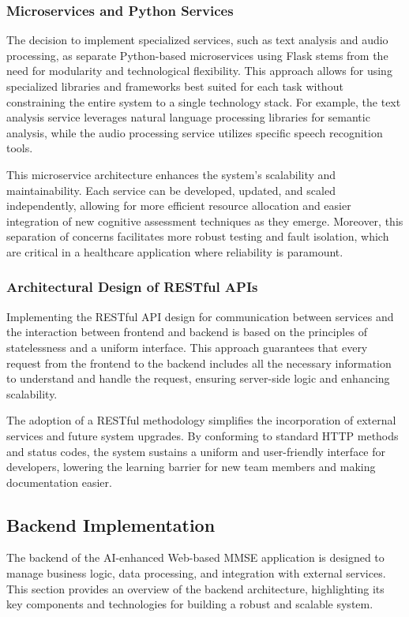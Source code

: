 \subsubsection{Microservices and Python Services}
The decision to implement specialized services, such as text analysis and audio processing, as separate Python-based microservices using Flask stems from the need for modularity and technological flexibility. This approach allows for using specialized libraries and frameworks best suited for each task without constraining the entire system to a single technology stack. For example, the text analysis service leverages natural language processing libraries for semantic analysis, while the audio processing service utilizes specific speech recognition tools.

This microservice architecture enhances the system's scalability and maintainability. Each service can be developed, updated, and scaled independently, allowing for more efficient resource allocation and easier integration of new cognitive assessment techniques as they emerge. Moreover, this separation of concerns facilitates more robust testing and fault isolation, which are critical in a healthcare application where reliability is paramount.

\subsubsection{Architectural Design of RESTful APIs}
Implementing the RESTful API design for communication between services and the interaction between frontend and backend is based on the principles of statelessness and a uniform interface. This approach guarantees that every request from the frontend to the backend includes all the necessary information to understand and handle the request, ensuring server-side logic and enhancing scalability.

The adoption of a RESTful methodology simplifies the incorporation of external services and future system upgrades. By conforming to standard HTTP methods and status codes, the system sustains a uniform and user-friendly interface for developers, lowering the learning barrier for new team members and making documentation easier.

\subsection{Backend Implementation}
The backend of the AI-enhanced Web-based MMSE application is designed to manage business logic, data processing, and integration with external services. This section provides an overview of the backend architecture, highlighting its key components and technologies for building a robust and scalable system.

